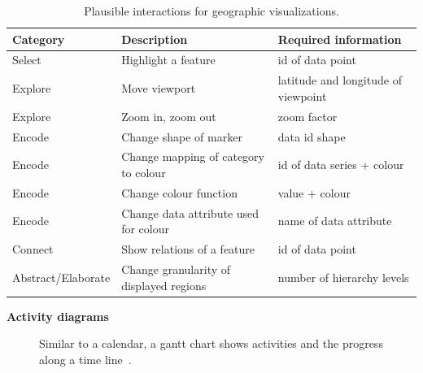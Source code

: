 \begin{table}[H]
  \begin{tabularx}{\linewidth}{lXX}
    \bf Category & \bf Description & \bf Required information \\
    \hline
    Select & Highlight a feature & id of data point \\
    Explore & Move viewport & latitude and longitude of viewpoint \\
    Explore & Zoom in, zoom out & zoom factor \\
    Encode & Change shape of marker & data id  shape \\
    Encode & Change mapping of category to colour & id of data series + colour \\
    Encode & Change colour function & value + colour \\
    Encode & Change data attribute used for colour & name of data attribute \\
    Connect & Show relations of a feature & id of data point  \\
    Abstract/Elaborate & Change granularity of displayed regions & number of hierarchy levels \\
  \end{tabularx}
  \caption{Plausible interactions for geographic visualizations.}%
  \label{tab:analysis:geographical:interactions}
\end{table}

\textbf{Activity diagrams}
\begin{figure}
  \centering
  \qquad
  \caption{Similar to a calendar, a gantt chart shows activities and the progress along a time line~\parencite{VisualizationCatalogue2017}.}%
  \label{fig:analysis:temporal}
\end{figure}

